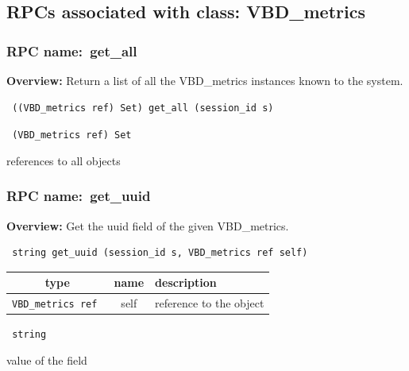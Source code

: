\subsection{RPCs associated with class: VBD\_metrics}
\subsubsection{RPC name:~get\_all}

{\bf Overview:} 
Return a list of all the VBD\_metrics instances known to the system.

\begin{verbatim} ((VBD_metrics ref) Set) get_all (session_id s)\end{verbatim}


\vspace{0.3cm}

{\tt 
(VBD\_metrics ref) Set
}


references to all objects
\vspace{0.3cm}
\vspace{0.3cm}
\vspace{0.3cm}
\subsubsection{RPC name:~get\_uuid}

{\bf Overview:} 
Get the uuid field of the given VBD\_metrics.

\begin{verbatim} string get_uuid (session_id s, VBD_metrics ref self)\end{verbatim}



 
\vspace{0.3cm}
\begin{tabular}{|c|c|p{7cm}|}
 \hline
{\bf type} & {\bf name} & {\bf description} \\ \hline
{\tt VBD\_metrics ref } & self & reference to the object \\ \hline 

\end{tabular}

\vspace{0.3cm}

{\tt 
string
}


value of the field
\vspace{0.3cm}
\vspace{0.3cm}
\vspace{0.3cm}

